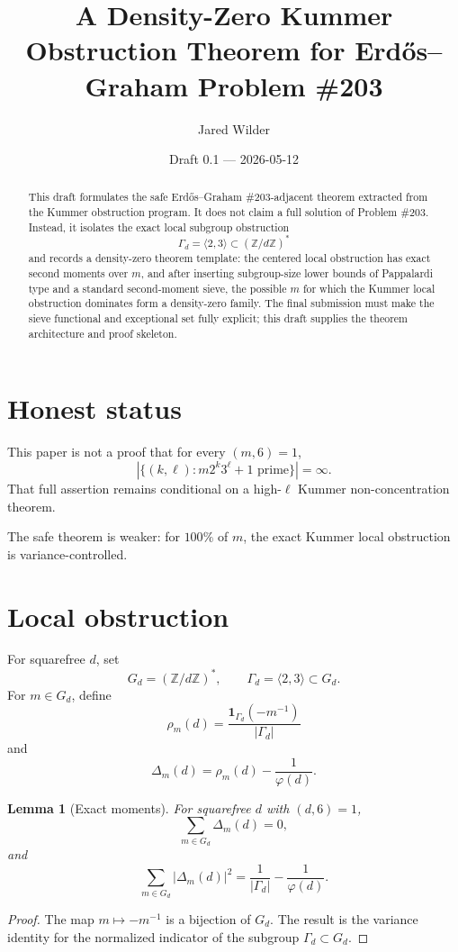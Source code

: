 \documentclass[11pt]{article}
\title{A Density-Zero Kummer Obstruction Theorem for Erd\H{o}s--Graham Problem \#203}
\author{Jared Wilder}
\date{Draft 0.1 --- 2026-05-12}
\newtheorem{lemma}{Lemma}
\newcommand{\Z}{\mathbb Z}
\newcommand{\1}{\mathbf 1}
\begin{document}
\maketitle

\begin{abstract}
This draft formulates the safe Erd\H{o}s--Graham \#203-adjacent theorem extracted from the Kummer obstruction program.  It does not claim a full solution of Problem \#203.  Instead, it isolates the exact local subgroup obstruction
\[
\Gamma_d=\langle2,3\rangle\subset(\Z/d\Z)^*
\]
and records a density-zero theorem template: the centered local obstruction has exact second moments over \(m\), and after inserting subgroup-size lower bounds of Pappalardi type and a standard second-moment sieve, the possible \(m\) for which the Kummer local obstruction dominates form a density-zero family.  The final submission must make the sieve functional and exceptional set fully explicit; this draft supplies the theorem architecture and proof skeleton.
\end{abstract}

\section{Honest status}

This paper is not a proof that for every \((m,6)=1\),
\[
|\{(k,\ell):m2^k3^\ell+1\text{ prime}\}|=\infty.
\]
That full assertion remains conditional on a high-\(\ell\) Kummer non-concentration theorem.

The safe theorem is weaker: for \(100\%\) of \(m\), the exact Kummer local obstruction is variance-controlled.

\section{Local obstruction}

For squarefree \(d\), set
\[
G_d=(\Z/d\Z)^*,\qquad \Gamma_d=\langle2,3\rangle\subset G_d.
\]
For \(m\in G_d\), define
\[
\rho_m(d)=\frac{\1_{\Gamma_d}(-m^{-1})}{|\Gamma_d|}
\]
and
\[
\Delta_m(d)=\rho_m(d)-\frac1{\varphi(d)}.
\]

\begin{lemma}[Exact moments]\label{L:moments}
For squarefree \(d\) with \((d,6)=1\),
\[
\sum_{m\in G_d}\Delta_m(d)=0,
\]
and
\[
\sum_{m\in G_d}|\Delta_m(d)|^2=
\frac1{|\Gamma_d|}-\frac1{\varphi(d)}.
\]
\end{lemma}

\begin{proof}
The map \(m\mapsto -m^{-1}\) is a bijection of \(G_d\).  The result is the variance identity for the normalized indicator of the subgroup \(\Gamma_d\subset G_d\).
\end{proof}
\end{document}
